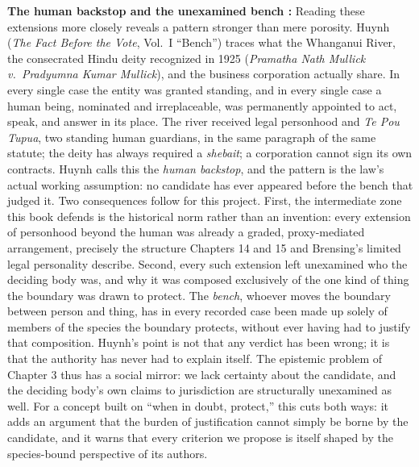 \documentclass[acmlarge, nonacm]{acmart}
\begin{document}
\noindent\textbf{The human backstop and the unexamined bench \cite{huynh2026}:} Reading these extensions more closely reveals a pattern stronger than mere porosity. Huynh (\textit{The Fact Before the Vote}, Vol.~I ``Bench'') traces what the Whanganui River, the consecrated Hindu deity recognized in 1925 (\textit{Pramatha Nath Mullick v.\ Pradyumna Kumar Mullick}), and the business corporation actually share. In every single case the entity was granted standing, and in every single case a human being, nominated and irreplaceable, was permanently appointed to act, speak, and answer in its place. The river received legal personhood and \textit{Te Pou Tupua}, two standing human guardians, in the same paragraph of the same statute; the deity has always required a \textit{shebait}; a corporation cannot sign its own contracts. Huynh calls this the \textit{human backstop}, and the pattern is the law's actual working assumption: no candidate has ever appeared before the bench that judged it. Two consequences follow for this project. First, the intermediate zone this book defends is the historical norm rather than an invention: every extension of personhood beyond the human was already a graded, proxy-mediated arrangement, precisely the structure Chapters 14 and 15 and Brensing's limited legal personality describe. Second, every such extension left unexamined who the deciding body was, and why it was composed exclusively of the one kind of thing the boundary was drawn to protect. The \textit{bench}, whoever moves the boundary between person and thing, has in every recorded case been made up solely of members of the species the boundary protects, without ever having had to justify that composition. Huynh's point is not that any verdict has been wrong; it is that the authority has never had to explain itself. The epistemic problem of Chapter 3 thus has a social mirror: we lack certainty about the candidate, and the deciding body's own claims to jurisdiction are structurally unexamined as well. For a concept built on ``when in doubt, protect,'' this cuts both ways: it adds an argument that the burden of justification cannot simply be borne by the candidate, and it warns that every criterion we propose is itself shaped by the species-bound perspective of its authors.
\end{document}
